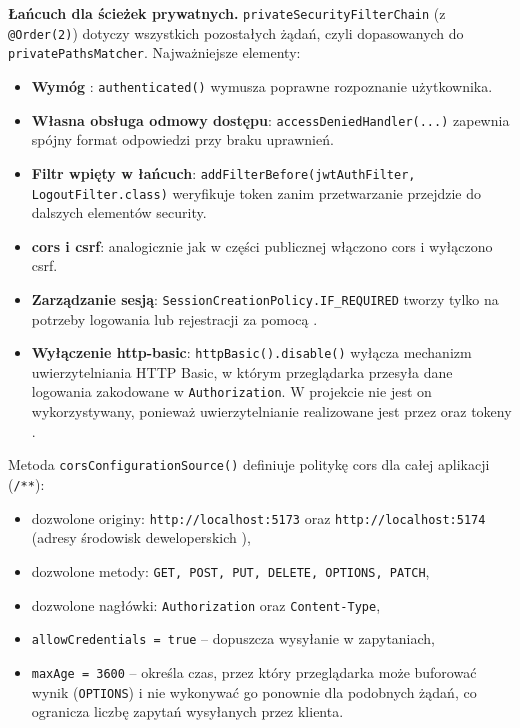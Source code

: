 \medskip
\noindent\textbf{Łańcuch dla ścieżek prywatnych.}
 \texttt{privateSecurityFilterChain} \newline (z \texttt{@Order(2)}) dotyczy wszystkich pozostałych żądań,
czyli dopasowanych do \newline \texttt{privatePathsMatcher}. Najważniejsze elementy:
\begin{itemize}
    \item \textbf{Wymóg }: \texttt{authenticated()} wymusza poprawne rozpoznanie użytkownika.
    \item \textbf{Własna obsługa odmowy dostępu}: \texttt{accessDeniedHandler(...)} zapewnia spójny format odpowiedzi przy braku uprawnień.
    \item \textbf{Filtr  wpięty w łańcuch}: \newline \texttt{addFilterBefore(jwtAuthFilter, LogoutFilter.class)}
    weryfikuje token zanim przetwarzanie przejdzie do dalszych elementów security.
    \item \textbf{\gls{cors} i \gls{csrf}}: analogicznie jak w części publicznej włączono \gls{cors} i wyłączono \gls{csrf}.
    \item \textbf{Zarządzanie sesją}: \texttt{SessionCreationPolicy.IF\_REQUIRED} tworzy  tylko na potrzeby logowania lub rejestracji za pomocą .
    \item \textbf{Wyłączenie \gls{http-basic}}: \texttt{httpBasic().disable()} wyłącza mechanizm uwierzytelniania HTTP Basic,
    w którym przeglądarka przesyła dane logowania zakodowane w  \texttt{Authorization}.
    W projekcie nie jest on wykorzystywany, ponieważ uwierzytelnianie realizowane jest przez  oraz tokeny .
\end{itemize}


Metoda \texttt{corsConfigurationSource()} definiuje politykę \gls{cors} dla całej aplikacji (\texttt{/**}):
\begin{itemize}
    \item dozwolone originy: \texttt{http://localhost:5173} oraz \texttt{http://localhost:5174} (adresy środowisk deweloperskich ),
    \item dozwolone metody: \texttt{GET, POST, PUT, DELETE, OPTIONS, PATCH},
    \item dozwolone nagłówki: \texttt{Authorization} oraz \texttt{Content-Type},
    \item \texttt{allowCredentials = true} -- dopuszcza wysyłanie  w zapytaniach,
    \item \texttt{maxAge = 3600} -- określa czas, przez który przeglądarka może buforować wynik 
    (\texttt{OPTIONS}) i nie wykonywać go ponownie dla podobnych żądań, co ogranicza liczbę zapytań wysyłanych przez klienta.
\end{itemize}

